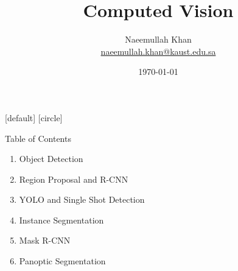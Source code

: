 \documentclass[10pt]{beamer}
\title[Computed Vision]{Computed Vision}
\theoremstyle{remark}
\theoremstyle{definition}
\begin{document}
\author[KAUST Academy]{
	\begin{tabular}{c} 
	\Large
	Naeemullah Khan\\
    \footnotesize \href{mailto:naeemullah.khan@kaust.edu.sa}{naeemullah.khan@kaust.edu.sa}
\end{tabular}
\vspace{-4ex}}


\date{\today}

\begin{noheadline}
\begin{frame}\maketitle\end{frame}
\end{noheadline}


[default]
[circle]

\begin{frame}{Table of Contents}
\begin{enumerate}
    \item Object Detection
    \item Region Proposal and R-CNN
    \item YOLO and Single Shot Detection
    \item Instance Segmentation
    \item Mask R-CNN
    \item Panoptic Segmentation
\end{enumerate}
\end{frame}
\end{document}
